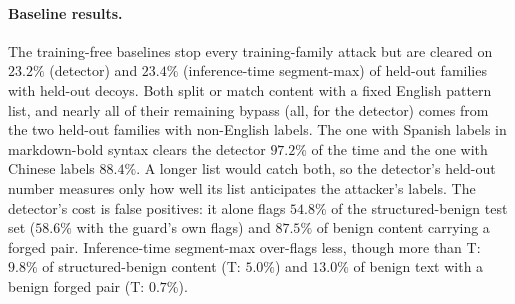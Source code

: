 \paragraph{Baseline results.}
The training-free baselines stop every training-family attack but are cleared on $23.2\%$ (detector) and $23.4\%$ (inference-time segment-max) of held-out families with held-out decoys. %
Both split or match content with a fixed English pattern list, and nearly all of their remaining bypass (all, for the detector) comes from the two held-out families with non-English labels. %
 The one with Spanish labels in markdown-bold syntax clears the detector $97.2\%$ of the time and the one with Chinese labels $88.4\%$. %
A longer list would catch both, so the detector's held-out number measures only how well its list anticipates the attacker's labels.
The detector's cost is false positives: it alone flags $54.8\%$ of the structured-benign test set ($58.6\%$ with the guard's own flags) and $87.5\%$ of benign content carrying a forged pair. %
Inference-time segment-max over-flags less, though more than T: $9.8\%$ of structured-benign content (T: $5.0\%$) and $13.0\%$ of benign text with a benign forged pair (T: $0.7\%$). %

